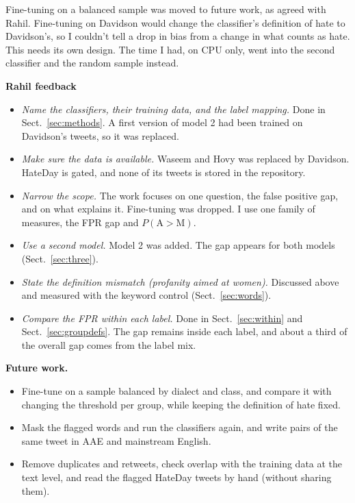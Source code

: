 \documentclass[runningheads,a4paper,oribibl]{llncs}
\begin{document}
Fine-tuning on a balanced sample was moved to future work, as
agreed with Rahil. Fine-tuning on Davidson would change the classifier's definition of
hate to Davidson's, so I couldn't tell a drop in bias from a change in what counts as hate.
This needs its own design. The time I had, on CPU only, went into the second classifier and
the random sample instead.

\textbf{Rahil feedback}
\begin{itemize}
  \item \emph{Name the classifiers, their training data, and the label mapping.} Done in
  Sect.~\ref{sec:methods}. A first version of model 2 had been trained on Davidson's tweets,
  so it was replaced.
  \item \emph{Make sure the data is available.} Waseem and Hovy was replaced by Davidson.
  HateDay is gated, and none of its tweets is stored in the repository.
  \item \emph{Narrow the scope.} The work focuses on one question, the false positive gap,
  and on what explains it. Fine-tuning was dropped. I use one family of measures, the FPR
  gap and $P(\mathrm{A}{>}\mathrm{M})$.
  \item \emph{Use a second model.} Model 2 was added. The gap appears for both models
  (Sect.~\ref{sec:three}).
  \item \emph{State the definition mismatch (profanity aimed at women).} Discussed above and
  measured with the keyword control (Sect.~\ref{sec:words}).
  \item \emph{Compare the FPR within each label.} Done in Sect.~\ref{sec:within} and
  Sect.~\ref{sec:groupdefs}. The gap remains inside each label, and about a third of the
  overall gap comes from the label mix.
\end{itemize}

\textbf{Future work.}
\begin{itemize}
  \item Fine-tune on a sample balanced by dialect and class, and compare it with 
  changing the threshold per group, while keeping the definition of hate fixed.
  \item Mask the flagged words and run the classifiers again, and write pairs of the same
  tweet in AAE and mainstream English.
  \item Remove duplicates and retweets, check overlap with the training data at the text level,
  and read the flagged HateDay tweets by hand (without sharing them).
\end{itemize}
\end{document}

